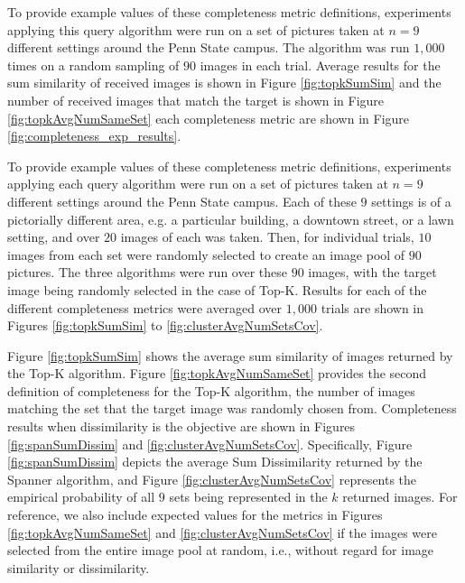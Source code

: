 To provide example values of these completeness metric definitions, experiments applying this query algorithm were run on a set of pictures taken at $n=9$ different settings around the Penn State campus.  The algorithm was run $1,000$ times on a random sampling of $90$ images in each trial.  Average results for the sum similarity of received images is shown in Figure \ref{fig:topkSumSim} and the number of received images that match the target is shown in Figure \ref{fig:topkAvgNumSameSet} each completeness metric are shown in Figure \ref{fig:completeness_exp_results}.  

To provide example values of these completeness metric definitions, experiments applying each query algorithm were run on a set of pictures taken at $n = 9$ different settings around the Penn State campus.  Each of these $9$ settings is of a pictorially different area, e.g. a particular building, a downtown street, or a lawn setting, and over $20$ images of each was taken.  Then, for individual trials, $10$ images from each set were randomly selected to create an image pool of $90$ pictures.  The three algorithms were run over these $90$ images, with the target image being randomly selected in the case of Top-K.  Results for each of the different completeness metrics were averaged over $1,000$ trials are shown in Figures \ref{fig:topkSumSim} to \ref{fig:clusterAvgNumSetsCov}.

Figure \ref{fig:topkSumSim} shows the average sum similarity of images returned by the Top-K algorithm.  Figure \ref{fig:topkAvgNumSameSet} provides the second definition of completeness for the Top-K algorithm, the number of images matching the set that the target image was randomly chosen from.  
Completeness results when dissimilarity is the objective are shown in Figures \ref{fig:spanSumDissim} and \ref{fig:clusterAvgNumSetsCov}.  Specifically, Figure \ref{fig:spanSumDissim} depicts the average Sum Dissimilarity returned by the Spanner algorithm, and 
Figure \ref{fig:clusterAvgNumSetsCov} represents the empirical probability of all $9$ sets being represented in the $k$ returned images.   For reference, we also include expected values for the metrics in Figures \ref{fig:topkAvgNumSameSet} and \ref{fig:clusterAvgNumSetsCov} if the images were selected from the entire image pool at random, i.e., without regard for image similarity or dissimilarity.  

